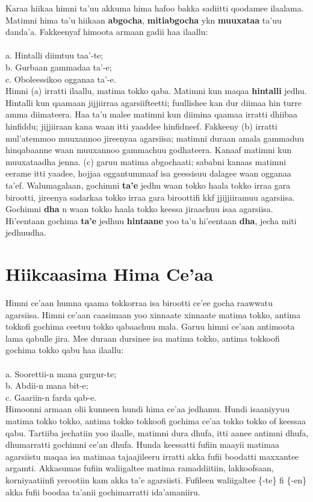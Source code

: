 \documentclass[11pt,b5paper]{book}
\begin{document}
Karaa hiikaa himni ta’uu akkuma hima hafoo bakka sadiitti qoodamee ilaalama. Matimni hima ta’u hiikaan \textbf{abgocha}, \textbf{mitiabgocha} ykn \textbf{muuxataa} ta’uu danda’a. Fakkeenyaf himoota
armaan gadii haa ilaallu:  \\
\\
a. Hintalli diimtuu taa’-te;\\
b. Gurbaan gammadaa ta’-e;\\
c. Oboleessikoo ogganaa ta’-e.\\

Himni (a) irratti ilaallu, matima tokko qaba. Matimni kun maqaa \textbf{hintalli} jedhu. Hintalli kun qaamaan jijjiirraa agarsiifteetti; fuullishee kan dur diimaa hin turre amma diimateera. Haa ta’u malee matimni kun diimina qaamaa irratti dhiibaa hinfiddu; jijjiiraan kana waan itti yaaddee hinfidneef. Fakkeeny (b) irratti mul’atemmoo muuxannoo jireenyaa agarsiisa; matimni duraan amala gammaduu hinqabaanne waan muuxannoo gammachuu godhateera. Kanaaf matimni kun muuxataadha jenna. (c) garuu matima abgochaati; sababni kanaas matimni eerame itti yaadee, hojjaa oggantummaaf isa geessisuu dalagee waan ogganaa ta’ef. Walumagalaan, gochimni \textbf{ta’e} jedhu waan tokko haala tokko irraa gara birootti, jireenya sadarkaa tokko irraa gara biroottifi kkf jjijjiiramuu agarsiisa. Gochimni \textbf{dha} n waan
tokko haala tokko keessa jiraachuu isaa agarsiisa. Hi'eentaan gochima \textbf{ta’e} jedhuu \textbf{hintaane} yoo ta’u hi'eentaan \textbf{dha}, jecha miti jedhuudha.

\section{Hiikcaasima Hima Ce'aa}

Himni ce’aan humna qaama tokkorraa isa birootti ce’ee gocha raawwatu agarsiisa. Himni ce’aan caasimaan yoo xinnaate xinnaate matima tokko, antima tokkofi gochima ceetuu tokko qabaachuu mala. Garuu himni ce’aan antimoota lama qabulle jira. Mee duraan dursinee isa matima tokko, antima tokkoofi
gochima tokko qabu haa ilaallu: \\
\\
a. Soorettii-n mana gurgur-te;\\
b. Abdii-n mana bit-e;\\
c. Gaariin-n farda qab-e.\\

Himoonni armaan olii kunneen hundi hima ce’aa jedhamu. Hundi isaaniyyuu matima tokko tokko, antima tokko tokkoofi gochima ce’aa tokko tokko of keessaa qabu. Tartiiba jechatiin yoo ilaalle, matimni dura dhufa, itti aanee antimni dhufa, dhumarratti gochimni ce’an dhufa. Hunda keessatti fufiin maayii matimaa agarsiistu maqaa isa matimaa tajaajileeru irratti akka fufii boodatti maxxantee argamti. Akkasumas fufiin waliigaltee matima ramaddiitiin, lakkoofsaan, korniyaatiinfi yerootiin kam akka ta’e agarsiisti. Fufileen waliigaltee \{-te\} fi \{-en\} akka fufii boodaa ta’anii gochimarratti ida’amaniiru. 
\end{document}
